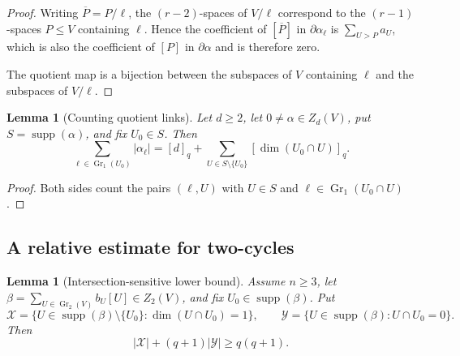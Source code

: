 \documentclass[11pt]{article}
\numberwithin{equation}{section}
\newtheorem{lemma}[theorem]{Lemma}
\newcommand{\Gr}{\operatorname{Gr}}
\newcommand{\supp}{\operatorname{supp}}
\begin{document}
\begin{proof}
Writing $\overline P=P/\ell$, the $(r-2)$-spaces of $V/\ell$
correspond to the $(r-1)$-spaces $P\le V$ containing $\ell$. Hence
the coefficient of $[\overline P]$ in $\partial\alpha_\ell$ is
$\sum_{U>P}a_U$, which is also the coefficient of $[P]$ in
$\partial\alpha$ and is therefore zero.

The quotient map is a bijection between the subspaces of $V$
containing $\ell$ and the subspaces of $V/\ell$. 
\end{proof}

\begin{lemma}[Counting quotient links]
\label{lem:counting-quotient-links}
Let $d\ge2$, let $0\ne\alpha\in Z_d(V)$, put
$S=\supp(\alpha)$, and fix $U_0\in S$. Then
\[
 \sum_{\ell\in\Gr_1(U_0)}|\alpha_\ell|
 =
 [d]_q+
 \sum_{U\in S\setminus\{U_0\}}[\dim(U_0\cap U)]_q.
\]
\end{lemma}

\begin{proof}
Both sides count the pairs $(\ell,U)$ with $U\in S$ and
$\ell\in\Gr_1(U_0\cap U)$.
\end{proof}

\subsection{A relative estimate for two-cycles}
\begin{lemma}[Intersection-sensitive lower bound]
\label{lem:relative-two-cycle}
Assume $n\ge3$, let
$\beta=\sum_{U\in\Gr_2(V)}b_U[U]\in Z_2(V)$, and fix
$U_0\in\supp(\beta)$. Put
\[
 \mathcal X=
 \{U\in\supp(\beta)\setminus\{U_0\}:\dim(U\cap U_0)=1\},
 \qquad
 \mathcal Y=
 \{U\in\supp(\beta):U\cap U_0=0\}.
\]
Then
\[
 |\mathcal X|+(q+1)|\mathcal Y|\ge q(q+1).
\]
\end{lemma}
\end{document}
